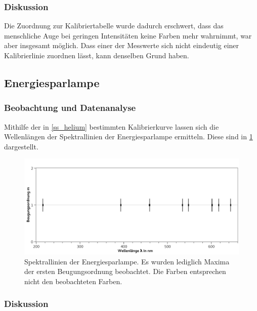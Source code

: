 \documentclass[
	a4paper,
	12pt,
	pagesize,
	ngerman
]{scrartcl}
\begin{document}
	\subsubsection{Diskussion}
	Die Zuordnung zur Kalibriertabelle wurde dadurch erschwert, dass das menschliche Auge bei geringen Intensitäten keine Farben mehr wahrnimmt, war aber insgesamt möglich.
	Dass einer der Messwerte sich nicht eindeutig einer Kalibrierlinie zuordnen lässt, kann denselben Grund haben.
	
	\subsection{Energiesparlampe}
	\subsubsection{Beobachtung und Datenanalyse}
	Mithilfe der in \cref{ss_helium} bestimmten Kalibrierkurve lassen sich die Wellenlängen der Spektrallinien der Energiesparlampe ermitteln.
	Diese sind in \cref{fig_spar} dargestellt.


	\begin{figure}[H] 
		\includegraphics[width=1\textwidth]{fig_spar} 
		\centering
		\caption{Spektrallinien der Energiesparlampe. 
		Es wurden lediglich Maxima der ersten Beugungsordnung beobachtet. %
		Die Farben entsprechen nicht den beobachteten Farben.}
		\label{fig_spar}
		\centering
	\end{figure}
	
	\subsubsection{Diskussion}
	
\end{document}
